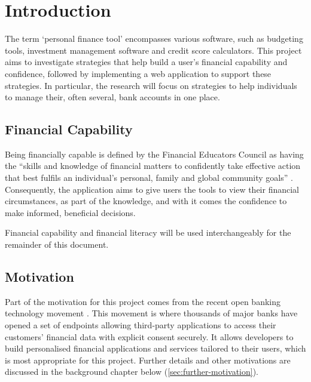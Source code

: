 \chapter{Introduction}
\label{ch:introduction}
The term `personal finance tool' encompasses various software, such as budgeting tools, investment management software and credit score calculators. This project aims to investigate strategies that help build a user's financial capability and confidence, followed by implementing a web application to support these strategies. In particular, the research will focus on strategies to help individuals to manage their, often several, bank accounts in one place.

\section{Financial Capability}
Being financially capable is defined by the Financial Educators Council as having the ``skills and knowledge of financial matters to confidently take effective action that best fulfils an individual's personal, family and global community goals'' \cite{FinancialEducatorsCouncil}. Consequently, the application aims to give users the tools to view their financial circumstances, as part of the knowledge, and with it comes the confidence to make informed, beneficial decisions.

Financial capability and financial literacy will be used interchangeably for the remainder of this document.

\section{Motivation}
Part of the motivation for this project comes from the recent open banking technology movement \cite{OpenBanking}. This movement is where thousands of major banks have opened a set of endpoints allowing third-party applications to access their customers' financial data with explicit consent securely. It allows developers to build personalised financial applications and services tailored to their users, which is most appropriate for this project. Further details and other motivations are discussed in the background chapter below (\ref{sec:further-motivation}).
